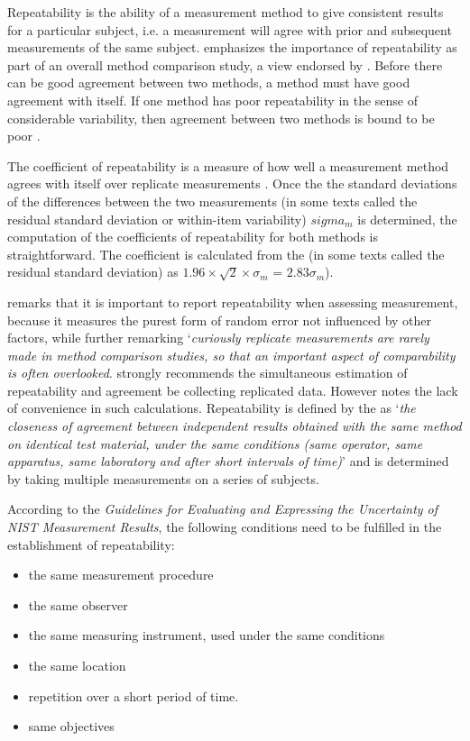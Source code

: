 \documentclass[12pt, a4paper]{report}
\theoremstyle{plain}
\theoremstyle{definition}
\theoremstyle{remark}
\begin{document}
		Repeatability is the ability of a measurement method to give consistent results for a particular subject, i.e. a measurement will agree with prior and subsequent measurements of the same subject. \citet{Barnhart} emphasizes the importance of repeatability as part of an overall method comparison study, a view endorsed by \citet{BXC2008}. Before there can be good agreement between two methods, a method must have good agreement with itself. If one method has poor repeatability in the sense of considerable
		variability, then agreement between two methods is bound to be
		poor \citep{ARoy2009}. 
		
		The coefficient of repeatability is a measure of how well a
		measurement method agrees with itself over replicate measurements
		\citep{BA99}. Once the the standard deviations of the differences between the two measurements (in some texts called the residual standard deviation or within-item variability) $sigma_m$ is determined, the
		computation of the coefficients of repeatability for both methods
		is straightforward. The coefficient is calculated from the (in some texts called the residual standard deviation) as  $1.96 \times \sqrt{2} \times \sigma_m$ = $2.83 \sigma_m$).
		
		\citet{Barnhart} remarks that it is important to report repeatability when assessing
		measurement, because it measures the purest form of random error
		not influenced by other factors, while further remarking `\textit{curiously replicate measurements are rarely made in method comparison studies, so that an important aspect of comparability is often overlooked}. \citet{BA99} strongly recommends the simultaneous estimation of repeatability and agreement be collecting replicated data.
		However \citet{ARoy2009} notes the lack of convenience in such calculations. 	Repeatability is defined by the \citet{IUPAC} as `\textit{the closeness of agreement between independent results obtained with the same method on identical test material, under the same conditions (same
			operator, same apparatus, same laboratory and after short intervals of time)}'  and is determined by taking multiple measurements on a series of subjects.
		
			According to the \textit{Guidelines for Evaluating and Expressing the Uncertainty of NIST Measurement Results}, the following conditions need to be fulfilled in the establishment of repeatability:
			\begin{itemize}
				\item	the same measurement procedure
				\item	the same observer
				\item	the same measuring instrument, used under the same conditions
				\item	the same location
				\item	repetition over a short period of time.
				\item  same objectives
			\end{itemize}
		
\end{document}
